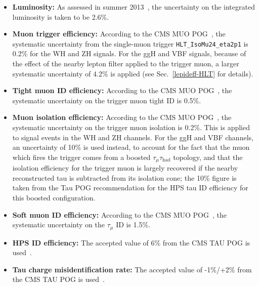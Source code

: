 \begin{itemize}
\item \textbf{Luminosity: } As assessed in summer 2013~\cite{CMS-PAS-LUM-13-001}, the uncertainty on the integrated luminosity is taken to be 2.6\%.
\item \textbf{Muon trigger efficiency: } According to the CMS MUO POG~\cite{CMS:muonuncertaintytwiki}, the systematic uncertainty from the single-muon trigger \texttt{HLT\_IsoMu24\_eta2p1} is 0.2\% for the WH and ZH signals. For the ggH and VBF signals, because of the effect of the nearby lepton filter applied to the trigger muon, a larger systematic uncertainty of 4.2\% is applied (see Sec.~\ref{lepideff-HLT} for details).
\item \textbf{Tight muon ID efficiency: } According to the CMS MUO POG~\cite{CMS:muonuncertaintytwiki}, the systematic uncertainty on the trigger muon tight ID is 0.5\%.
\item \textbf{Muon isolation efficiency: } According to the CMS MUO POG~\cite{CMS:muonuncertaintytwiki}, the systematic uncertainty on the trigger muon isolation is 0.2\%. This is applied to signal events in the WH and ZH channels. For the ggH and VBF channels, an uncertainty of 10\% is used instead, to account for the fact that the muon which fires the trigger comes from a boosted $\tau_{\mu}\tau_{\text{had}}$ topology, and that the isolation efficiency for the trigger muon is largely recovered if the nearby reconstructed tau is subtracted from its isolation cone; the 10\% figure is taken from the Tau POG recommendation for the HPS tau ID efficiency for this boosted configuration.
\item \textbf{Soft muon ID efficiency: } According to the CMS MUO POG~\cite{CMS:muonuncertaintytwiki}, the systematic uncertainty on the $\tau_{\mu}$ ID is 1.5\%.
\item \textbf{HPS ID efficiency: } The accepted value of 6\% from the CMS TAU POG is used~\cite{CMS:tauuncertaintytwiki}.
\item \textbf{Tau charge misidentification rate: } The accepted value of -1\%/+2\% from the CMS TAU POG is used~\cite{CMS:tauuncertaintytwiki}.

\end{itemize}
